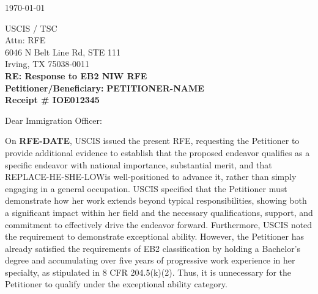 \documentclass{pl_template}  %
\begin{document}
\renewcommand{\Petitioner}{\textbf{PETITIONER-NAME}} %
\newcommand{\CaseNumber}{IOE012345} %

\renewcommand{\TypeOfPetition}{Case number: \CaseNumber} %
\newcommand{\HeSheLow}{REPLACE-HE-SHE-LOW} %
\newcommand{\HeSheUp}{REPLACE-HE-SHE-UP} %
\newcommand{\HisHerLow}{REPLACE-HIS-HER-LOW} %
\newcommand{\MrMs}{REPLACE-MR-MS} %
\firstpageheader


\begin{center}
    \today
\end{center}

\vspace{2em}
\raggedright{  %
USCIS / TSC\\
Attn: RFE\\
6046 N Belt Line Rd, STE 111\\ 
Irving, TX 75038-0011\\
\vspace{2em}
\textbf{RE:	\hspace*{8em}  Response to EB2 NIW RFE  } \\
\textbf{Petitioner/Beneficiary:} \hspace*{0.3em}\textbf{\Petitioner\\
\textbf{Receipt \#} \hspace*{6em}\CaseNumber\\
}

\vspace{3em}

\noindent Dear Immigration Officer: 

\hspace*{2em} On \textbf{RFE-DATE}, USCIS issued the present RFE, requesting the Petitioner to provide additional evidence to establish that the proposed endeavor qualifies as a specific endeavor with national importance, substantial merit, and that \HeSheLow  is well-positioned to advance it, rather than simply engaging in a general occupation. USCIS specified that the Petitioner must demonstrate how her work extends beyond typical responsibilities, showing both a significant impact within her field and the necessary qualifications, support, and commitment to effectively drive the endeavor forward. Furthermore, USCIS noted the requirement to demonstrate exceptional ability. However, the Petitioner has already satisfied the requirements of EB2 classification by holding a Bachelor’s degree and accumulating over five years of progressive work experience in her specialty, as stipulated in 8 CFR 204.5(k)(2). Thus, it is unnecessary for the Petitioner to qualify under the exceptional ability category.

}
\end{document}
